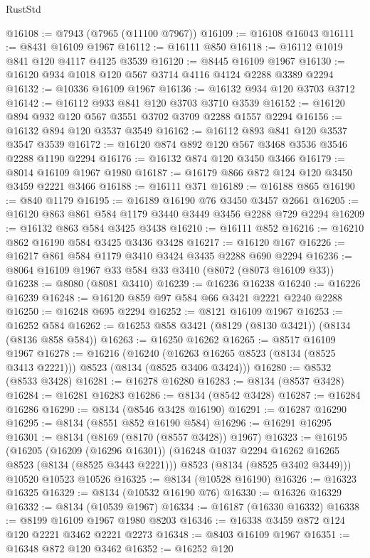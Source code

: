 \begin{lexlean}{RustStd}
\begin{coremodule}
@16108 := @7943 (@7965 (@11100 @7967))
@16109 := @16108 @16043
@16111 := @8431 @16109 @1967
@16112 := @16111 @850
@16118 := @16112 @1019 @841 @120 @4117 @4125 @3539
@16120 := @8445 @16109 @1967
@16130 := @16120 @934 @1018 @120 @567 @3714 @4116 @4124 @2288 @3389 @2294
@16132 := @10336 @16109 @1967
@16136 := @16132 @934 @120 @3703 @3712
@16142 := @16112 @933 @841 @120 @3703 @3710 @3539
@16152 := @16120 @894 @932 @120 @567 @3551 @3702 @3709 @2288 @1557 @2294
@16156 := @16132 @894 @120 @3537 @3549
@16162 := @16112 @893 @841 @120 @3537 @3547 @3539
@16172 := @16120 @874 @892 @120 @567 @3468 @3536 @3546 @2288 @1190 @2294
@16176 := @16132 @874 @120 @3450 @3466
@16179 := @8014 @16109 @1967 @1980
@16187 := @16179 @866 @872 @124 @120 @3450 @3459 @2221 @3466
@16188 := @16111 @371
@16189 := @16188 @865
@16190 := @840 @1179
@16195 := @16189 @16190 @76 @3450 @3457 @2661
@16205 := @16120 @863 @861 @584 @1179 @3440 @3449 @3456 @2288 @729 @2294
@16209 := @16132 @863 @584 @3425 @3438
@16210 := @16111 @852
@16216 := @16210 @862 @16190 @584 @3425 @3436 @3428
@16217 := @16120 @167
@16226 := @16217 @861 @584 @1179 @3410 @3424 @3435 @2288 @690 @2294
@16236 := @8064 @16109 @1967 @33 @584 @33 @3410 (@8072 (@8073 @16109 @33))
@16238 := @8080 (@8081 @3410)
@16239 := @16236 @16238
@16240 := @16226 @16239
@16248 := @16120 @859 @97 @584 @66 @3421 @2221 @2240 @2288
@16250 := @16248 @695 @2294
@16252 := @8121 @16109 @1967
@16253 := @16252 @584
@16262 := @16253 @858 @3421 (@8129 (@8130 @3421)) (@8134 (@8136 @858 @584))
@16263 := @16250 @16262
@16265 := @8517 @16109 @1967
@16278 := @16216
    (@16240 (@16263 @16265 @8523 (@8134 (@8525 @3413 @2221))) @8523 (@8134 (@8525 @3406 @3424)))
@16280 := @8532 (@8533 @3428)
@16281 := @16278 @16280
@16283 := @8134 (@8537 @3428)
@16284 := @16281 @16283
@16286 := @8134 (@8542 @3428)
@16287 := @16284 @16286
@16290 := @8134 (@8546 @3428 @16190)
@16291 := @16287 @16290
@16295 := @8134 (@8551 @852 @16190 @584)
@16296 := @16291 @16295
@16301 := @8134 (@8169 (@8170 (@8557 @3428)) @1967)
@16323 := @16195
    (@16205
      (@16209 (@16296 @16301))
      (@16248 @1037 @2294 @16262 @16265 @8523 (@8134 (@8525 @3443 @2221)))
      @8523
      (@8134 (@8525 @3402 @3449)))
    @10520
    @10523
    @10526
@16325 := @8134 (@10528 @16190)
@16326 := @16323 @16325
@16329 := @8134 (@10532 @16190 @76)
@16330 := @16326 @16329
@16332 := @8134 (@10539 @1967)
@16334 := @16187 (@16330 @16332)
@16338 := @8199 @16109 @1967 @1980 @8203
@16346 := @16338 @3459 @872 @124 @120 @2221 @3462 @2221 @2273
@16348 := @8403 @16109 @1967
@16351 := @16348 @872 @120 @3462
@16352 := @16252 @120

\end{coremodule}
\end{lexlean}
